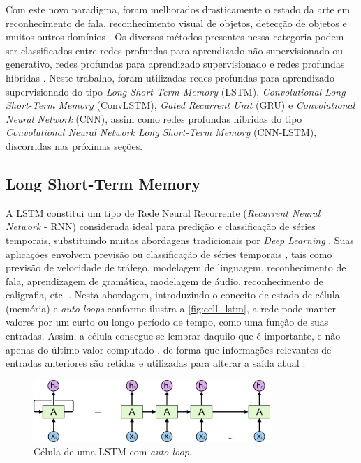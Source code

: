 Com este novo paradigma, foram melhorados drasticamente o estado da arte em reconhecimento de fala, reconhecimento visual de objetos, detecção de objetos e muitos outros domínios \cite{LeCun2015}. Os diversos métodos presentes nessa categoria podem ser classificados entre redes profundas para aprendizado não supervisionado ou generativo, redes profundas para aprendizado supervisionado e redes profundas híbridas \cite{Deng2014}. Neste trabalho, foram utilizadas redes  profundas para aprendizado supervisionado do tipo \textit{Long Short-Term Memory} (LSTM), \textit{Convolutional Long Short-Term Memory} (ConvLSTM), \textit{Gated Recurrent Unit} (GRU)  e \textit{Convolutional Neural Network} (CNN), assim como redes profundas híbridas do tipo \textit{Convolutional Neural Network Long Short-Term Memory} (CNN-LSTM), discorridas nas próximas seções.

\subsection{Long Short-Term Memory}

A LSTM constitui um tipo de Rede Neural Recorrente (\textit{Recurrent Neural Network} - RNN) considerada ideal para predição e classificação de séries temporais, substituindo muitas abordagens tradicionais por \textit{Deep Learning} \cite{Zaccone2017}. Suas aplicações envolvem previsão ou classificação de séries temporais \cite{Zaccone2017}, tais como previsão de velocidade de tráfego, modelagem de linguagem, reconhecimento de fala, aprendizagem de gramática, modelagem de áudio, reconhecimento de caligrafia, etc. \cite{Bianchi2017}. Nesta abordagem, introduzindo o conceito de estado de célula (memória) e \textit{auto-loops} conforme ilustra a \autoref{fig:cell_lstm}, a rede pode manter valores por um curto ou longo período de tempo, como uma função de suas entradas. Assim, a célula consegue se lembrar daquilo que é importante, e não apenas do último valor computado \cite{Jones2017}, de forma que informações relevantes de entradas anteriores são retidas e utilizadas para alterar a saída atual \cite{Zebin2018}.

\begin{figure}[h]
  \centering
  \caption{Célula de uma LSTM com \textit{auto-loop}.}
   \label{fig:cell_lstm}
   \includegraphics[width=0.8\textwidth]{figuras/fig_8.png}
\end{figure}

